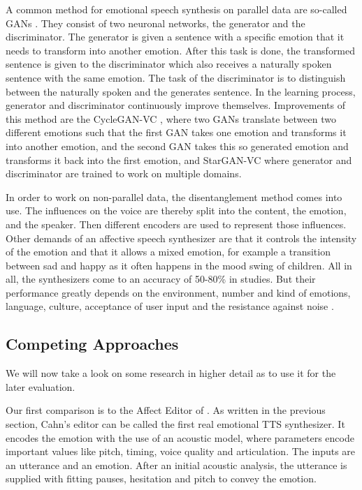 \documentclass[11pt]{article}
\begin{document}
A common method for emotional speech synthesis on parallel data are so-called GANs \cite{goodfellow2020generative}. They consist of two neuronal networks, the generator and the discriminator. The generator is given a sentence with a specific emotion that it needs to transform into another emotion. After this task is done, the transformed sentence is given to the discriminator which also receives a naturally spoken sentence with the same emotion. The task of the discriminator is to distinguish between the naturally spoken and the generates sentence. In the learning process, generator and discriminator continuously improve themselves. Improvements of this method are the CycleGAN-VC \cite{kaneko2018cyclegan}, where two GANs translate between two different emotions such that the first GAN takes one emotion and transforms it into another emotion, and the second GAN takes this so generated emotion and transforms it back into the first emotion, and StarGAN-VC \cite{kameoka2018stargan} where generator and discriminator are trained to work on multiple domains.

In order to work on non-parallel data, the disentanglement method comes into use. The influences on the voice are thereby split into the content, the emotion, and the speaker. Then different encoders are used to represent those influences.
Other demands of an affective speech synthesizer are that it controls the intensity of the emotion and that it allows a mixed emotion, for example a transition between sad and happy as it often happens in the mood swing of children. All in all, the synthesizers come to an accuracy of 50-80\% in studies. But their performance greatly depends on the environment, number and kind of emotions, language, culture, acceptance of user input and the resistance against noise \cite{triantafyllopoulos_overview_2023}.


\subsection{Competing Approaches}
\label{competing_approaches}
We will now take a look on some research in higher detail as to use it for the later evaluation. 

Our first comparison is to the Affect Editor of \cite{cahn_generation_2000}. As written in the previous section, Cahn's editor can be called the first real emotional TTS synthesizer. It encodes the emotion with the use of an acoustic model, where parameters encode important values like pitch, timing, voice quality and articulation. The inputs are an utterance and an emotion. After an initial acoustic analysis, the utterance is supplied with fitting pauses, hesitation and pitch to convey the emotion.
\end{document}
